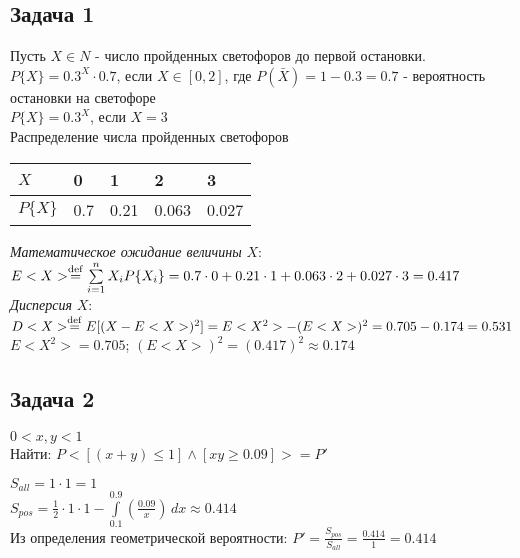 \documentclass[12pt]{article}
\begin{document}
		\subsection*{Задача 1}
			Пусть $X \in N$ - число пройденных светофоров до первой остановки. 
			$P\{X\} = 0.3^{X}\cdot 0.7$, если $X \in [0, 2]$, где $P(\bar{X}) = 1 - 0.3 = 0.7$ - вероятность остановки на светофоре  \\
			$P\{X\} = 0.3^{X}$, если $X = 3$ \\
			Распределение числа пройденных светофоров\\
			\begin{tabular}{ | l | l | l | l | l |}
				\hline
				$X$ & 0 & 1 & 2 & 3 \\ \hline
				$P\{X\}$ & 0.7 & 0.21 & 0.063 & 0.027 \\ \hline
			\end{tabular}
			\newline
			\textit{Математическое ожидание величины} $X$: $E<X> \stackrel{\rm def}{=} \sum\limits_{i=1}^{n}X_{i}P\{X_{i}\} = 0.7\cdot 0 + 0.21\cdot 1 + 0.063\cdot2 + 0.027\cdot3 = 0.417$ \\
			\textit{Дисперсия} $X$: $D<X> \stackrel{\rm def}{=} E[(X - E<X>)^{2}] = E<X^{2}> - (E<X>)^2 = 0.705 - 0.174 = 0.531$\\
			$E<X^{2}> = 0.705$; $(E<X>)^{2} = (0.417)^2 \approx 0.174$\\
			
			\subsection*{Задача 2}
				$0 < x,y < 1$\\
				Найти: $P<[(x+y) \leq 1] \wedge [xy \geq 0.09]> = P'$ \\
			\newline
			$S_{all} = 1\cdot1 = 1$ \\
			$S_{pos} = \frac{1}{2}\cdot1\cdot1 - \int\limits_{0.1}^{0.9} (\frac{0.09}{x})\,dx \approx 0.414$	\\
			Из определения геометрической вероятности: $P' = \frac{S_{pos}}{S_{all}} = \frac{0.414}{1} = 0.414$ \\
\end{document}
